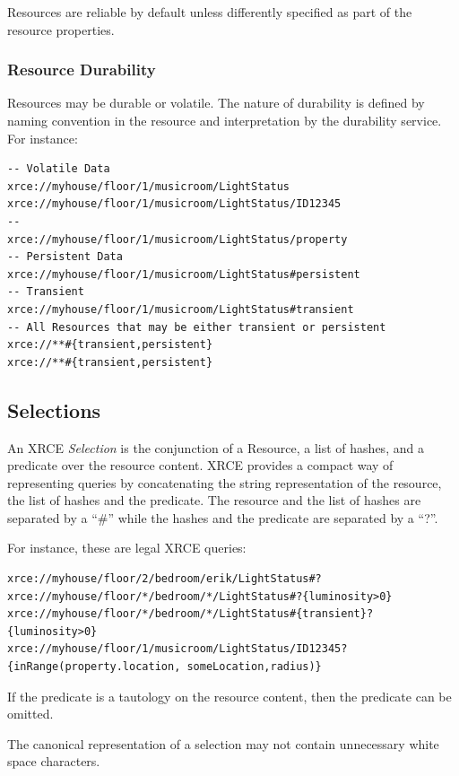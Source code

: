 \documentclass[a4paper,oneside,article]{memoir}
\begin{document}
Resources are reliable by default unless differently specified as part of the resource properties.

\subsubsection{Resource Durability}

Resources may be durable or volatile. The nature of durability is defined by naming convention in
the resource and interpretation by the durability service. For instance:

\begin{verbatim}
-- Volatile Data
xrce://myhouse/floor/1/musicroom/LightStatus 
xrce://myhouse/floor/1/musicroom/LightStatus/ID12345 
-- 
xrce://myhouse/floor/1/musicroom/LightStatus/property
-- Persistent Data
xrce://myhouse/floor/1/musicroom/LightStatus#persistent
-- Transient    
xrce://myhouse/floor/1/musicroom/LightStatus#transient
-- All Resources that may be either transient or persistent 
xrce://**#{transient,persistent}
xrce://**#{transient,persistent}
\end{verbatim}

\subsection{Selections}

An XRCE \emph{Selection} is the conjunction of a Resource, a list of hashes, and a predicate over
the resource content.  XRCE provides a compact way of representing queries by concatenating the
string representation of the resource, the list of hashes and the predicate.  The resource and the
list of hashes are separated by a ``\#'' while the hashes and the predicate are separated by a ``?''.

For instance, these are legal XRCE queries:
\begin{verbatim}
xrce://myhouse/floor/2/bedroom/erik/LightStatus#?
xrce://myhouse/floor/*/bedroom/*/LightStatus#?{luminosity>0}
xrce://myhouse/floor/*/bedroom/*/LightStatus#{transient}?{luminosity>0}
xrce://myhouse/floor/1/musicroom/LightStatus/ID12345?{inRange(property.location, someLocation,radius)}
\end{verbatim}

If the predicate is a tautology on the resource content, then the predicate can be omitted.

The canonical representation of a selection may not contain unnecessary white space characters.
\end{document}
